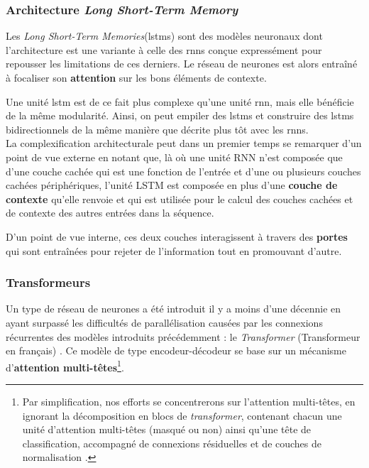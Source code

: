 \documentclass[12pt, twoside]{report}
\begin{document}
\subsubsection{Architecture \textit{Long Short-Term Memory}} \label{lstm_def}

Les \textit{Long Short-Term Memories}(\Glspl{lstm}) sont des modèles neuronaux dont l'architecture est une variante à celle des \Glspl{rnn} conçue expressément pour repousser les limitations de ces derniers. Le réseau de neurones est alors entraîné à focaliser son \textbf{attention} sur les bons éléments de contexte.

Une unité \Gls{lstm} est de ce fait plus complexe qu'une unité \Gls{rnn}, mais elle bénéficie de la même modularité. Ainsi, on peut empiler des \Glspl{lstm} et construire des \Glspl{lstm} bidirectionnels de la même manière que décrite plus tôt avec les \Glspl{rnn}.\\

La complexification architecturale peut dans un premier temps se remarquer d'un point de vue externe en notant que, là où une unité RNN n'est composée que d'une couche cachée qui est une fonction de l'entrée et d'une ou plusieurs couches cachées périphériques, l'unité LSTM est composée en plus d'une \textbf{couche de contexte} qu'elle renvoie et qui est utilisée pour le calcul des couches cachées et de contexte des autres entrées dans la séquence.

D'un point de vue interne, ces deux couches interagissent à travers des \textbf{portes} qui sont entraînées pour rejeter de l'information tout en promouvant d'autre. \autocite[cf.][chap. 9, p. 14-16]{jurafsky}

\subsubsection{Transformeurs} \label{transformers}

Un type de réseau de neurones a été introduit il y a moins d'une décennie en ayant surpassé les difficultés de parallélisation causées par les connexions récurrentes des modèles introduits précédemment : le \textit{Transformer} (Transformeur en français) \autocite{transformer}. Ce modèle de type encodeur-décodeur se base sur un mécanisme d'\textbf{attention multi-têtes}\footnote{Par simplification, nos efforts se concentrerons sur l'attention multi-têtes, en ignorant la décomposition en blocs de \textit{transformer}, contenant chacun une unité d'attention multi-têtes (masqué ou non) ainsi qu'une tête de classification, accompagné de connexions résiduelles et de couches de normalisation \cite[pour plus de détails, voir][{}]{transformer}.}.\\
\end{document}
